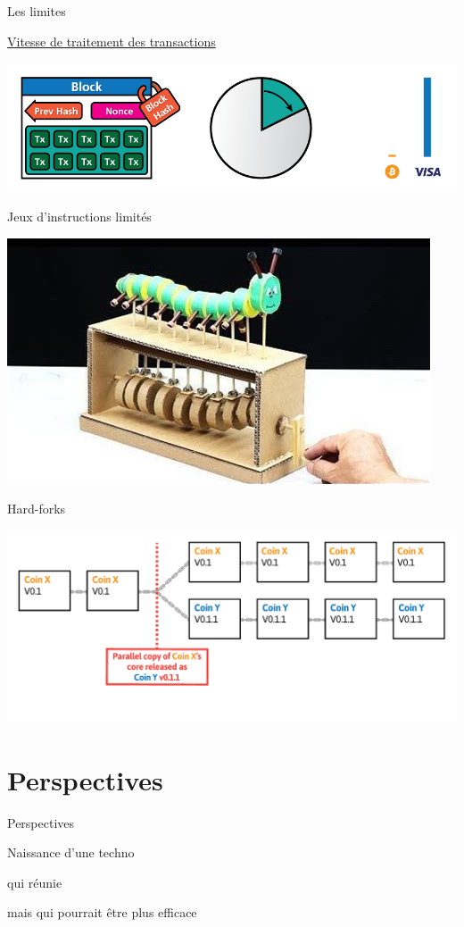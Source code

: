 \documentclass[presentation]{beamer}
\begin{document}
\begin{frame}[label={sec:org7eec08b}]{Les limites}
\begin{block}{\href{https://www.blockchain.com/explorer/charts/transactions-per-second}{Vitesse de traitement des transactions}}
\begin{center}
\includegraphics[width=\textwidth]{Pictures/cryptographics/the-scaling-issue.png}
\end{center}
\end{block}
\begin{block}{Jeux d'instructions limités}
\begin{center}
\includegraphics[width=.9\textwidth]{Pictures/automate_simple.jpeg}
\end{center}
\end{block}
\begin{block}{Hard-forks}
\begin{center}
\includegraphics[width=.9\textwidth]{Pictures/cryptographics/blockchain-hard-fork.png}
\end{center}
\end{block}
\end{frame}

\section{Perspectives}
\label{sec:orgf246700}
\begin{frame}[label={sec:org7df0c43}]{Perspectives}
\begin{block}{}
\begin{block}{Naissance d'une techno}
\end{block}
\begin{block}{qui réunie}
\end{block}
\begin{block}{mais qui pourrait être plus efficace}
\end{block}
\end{block}
\end{frame}
\end{document}
